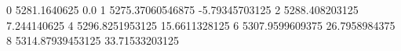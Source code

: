 0 5281.1640625 0.0
1 5275.37060546875 -5.79345703125
2 5288.408203125 7.244140625
4 5296.8251953125 15.6611328125
6 5307.9599609375 26.7958984375
8 5314.87939453125 33.71533203125
